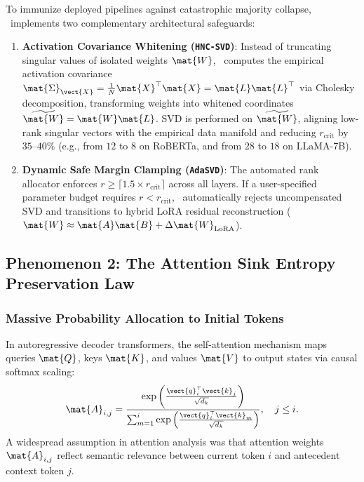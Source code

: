 To immunize deployed pipelines against catastrophic majority collapse, \neuralops\ implements two complementary architectural safeguards:
\begin{enumerate}
    \item \textbf{Activation Covariance Whitening (\texttt{HNC-SVD})}: Instead of truncating singular values of isolated weights $\mat{W}$, \neuralops\ computes the empirical activation covariance $\mat{\Sigma}_{\vect{X}} = \frac{1}{N}\mat{X}^\top \mat{X} = \mat{L}\mat{L}^\top$ via Cholesky decomposition, transforming weights into whitened coordinates $\widetilde{\mat{W}} = \mat{W}\mat{L}$. SVD is performed on $\widetilde{\mat{W}}$, aligning low-rank singular vectors with the empirical data manifold and reducing $r_{\text{crit}}$ by $35\text{--}40\%$ (e.g., from $12$ to $8$ on RoBERTa, and from $28$ to $18$ on LLaMA-7B).
    \item \textbf{Dynamic Safe Margin Clamping (\texttt{AdaSVD})}: The automated rank allocator enforces $r \ge \lceil 1.5 \times r_{\text{crit}} \rceil$ across all layers. If a user-specified parameter budget requires $r < r_{\text{crit}}$, \neuralops\ automatically rejects uncompensated SVD and transitions to hybrid LoRA residual reconstruction ($\mat{W} \approx \mat{A}\mat{B} + \Delta\mat{W}_{\text{LoRA}}$).
\end{enumerate}

\subsection{Phenomenon 2: The Attention Sink Entropy Preservation Law}
\label{sec:phenom_attention_sink}

\subsubsection{Massive Probability Allocation to Initial Tokens}
\label{sec:phenom_sink_discovery}

In autoregressive decoder transformers, the self-attention mechanism maps queries $\mat{Q}$, keys $\mat{K}$, and values $\mat{V}$ to output states via causal softmax scaling:
\begin{equation}
\label{eq:causal_softmax_attention}
\mat{A}_{i, j} = \frac{\exp\left(\frac{\vect{q}_i^\top \vect{k}_j}{\sqrt{d_k}}\right)}{\sum_{m=1}^{i} \exp\left(\frac{\vect{q}_i^\top \vect{k}_m}{\sqrt{d_k}}\right)}, \quad j \le i.
\end{equation}
A widespread assumption in attention analysis was that attention weights $\mat{A}_{i, j}$ reflect semantic relevance between current token $i$ and antecedent context token $j$. 

